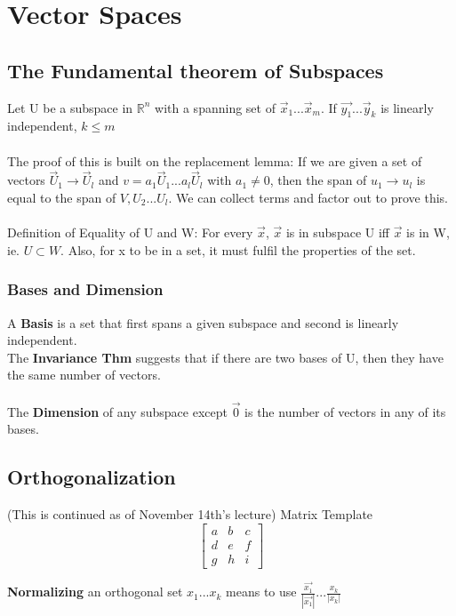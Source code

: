 \documentclass[10pt, twocolumn]{report}
\begin{document}
  \chapter{Vector Spaces}
  \section {The Fundamental theorem of Subspaces}
  Let U be a subspace in $\mathbb{R}^n$ with a spanning set of {$\vec x_1 ... \vec x_m$}. If {$\vec{y_1} ... \vec y_k$} is linearly independent, $k\leq m$\\\\
  The proof of this is built on the replacement lemma: If we are given a set of vectors $\vec U_1 \to \vec U_l$ and $v = a_1 \vec U_1 ... a_l \vec U_l$ with $a_1 \neq 0$, then the span of $u_1 \to u_l$ is equal to the span of {$V, U_2 ... U_l$}. We can collect terms and factor out to prove this. \\\\
  Definition of Equality of U and W: For every $\vec x$, $\vec x$ is in subspace U iff $\vec x$ is in W, ie. $U \subset W$. Also, for x to be in a set, it must fulfil the properties of the set.

  \subsection{Bases and Dimension}
  A \textbf{Basis} is a set that first spans a given subspace and second is linearly independent. \\ The \textbf{Invariance Thm} suggests that if there are two bases of U, then they have the same number of vectors.\\\\
  The \textbf{Dimension} of any subspace except $\vec 0$ is the number of vectors in any of its bases.


  \section{Orthogonalization}
  (This is continued as of November 14th's lecture)
Matrix Template
 $$\begin{bmatrix}
  a & b & c \\
  d & e & f \\
  g & h & i
\end{bmatrix}$$

\textbf{Normalizing} an orthogonal set ${x_1 ... x_k}$ means to use ${\frac{\vec{x_1}}{|\vec{x_1}|} ... \frac{x_k}{|x_k|}}$ \\\\
\end{document}

